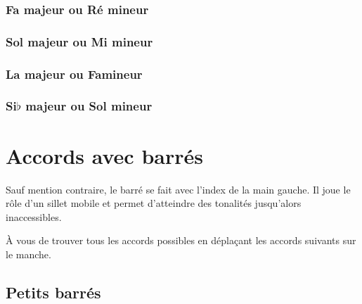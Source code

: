 \documentclass[11pt]{article}
\begin{document}
\subsubsection{Fa majeur ou Ré mineur}


\subsubsection{Sol majeur ou Mi mineur}


\subsubsection{La majeur ou Fa\shrp mineur}


\subsubsection{Si$\flat$ majeur ou Sol mineur}


\section{Accords avec barrés}

Sauf mention contraire, le barré se fait avec l’index de la main gauche. Il
joue le rôle d’un sillet mobile et permet d’atteindre des tonalités jusqu’alors
inaccessibles.

À vous de trouver tous les accords possibles en déplaçant les accords suivants
sur le manche.

\subsection{Petits barrés}
\end{document}
